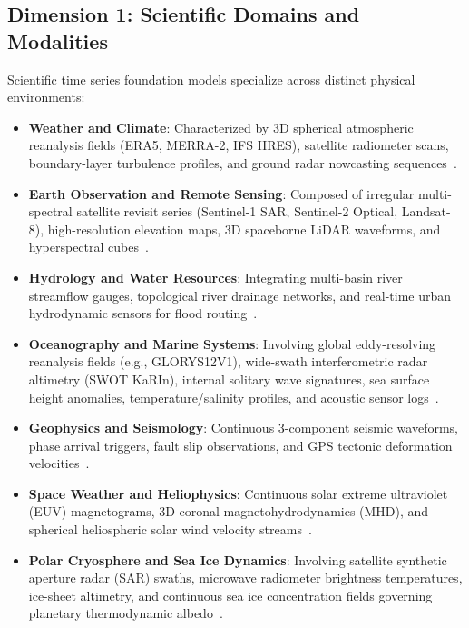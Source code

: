 \subsection{Dimension 1: Scientific Domains and Modalities}
Scientific time series foundation models specialize across distinct physical environments:
\begin{itemize}
    \item \textbf{Weather and Climate}: Characterized by 3D spherical atmospheric reanalysis fields (ERA5, MERRA-2, IFS HRES), satellite radiometer scans, boundary-layer turbulence profiles, and ground radar nowcasting sequences~\cite{bi2023pangu,lam2023graphcast,pathak2022fourcastnet,bodnar2024aurora,nguyen2023stormer,li2024seeds,brandstetter2023clifford,lozano2023buildingblock}.
    \item \textbf{Earth Observation and Remote Sensing}: Composed of irregular multi-spectral satellite revisit series (Sentinel-1 SAR, Sentinel-2 Optical, Landsat-8), high-resolution elevation maps, 3D spaceborne LiDAR waveforms, and hyperspectral cubes~\cite{cong2022satmae,tseng2023presto,tseng2025galileo,jakubik2023prithvi,brown2025alphaearth,smith2023earthpt,xiong2024dofa,hong2024spectralgpt,lang2023canopy}.
    \item \textbf{Hydrology and Water Resources}: Integrating multi-basin river streamflow gauges, topological river drainage networks, and real-time urban hydrodynamic sensors for flood routing~\cite{nearing2024globalflood,kratzert2023caravan,ji2025entropy}.
    \item \textbf{Oceanography and Marine Systems}: Involving global eddy-resolving reanalysis fields (e.g., GLORYS12V1), wide-swath interferometric radar altimetry (SWOT KaRIn), internal solitary wave signatures, sea surface height anomalies, temperature/salinity profiles, and acoustic sensor logs~\cite{wang2024xihe,elaouni2025oceanbench,bi2024oceangpt,cutolo2025swot,wan2024ste}.
    \item \textbf{Geophysics and Seismology}: Continuous 3-component seismic waveforms, phase arrival triggers, fault slip observations, and GPS tectonic deformation velocities~\cite{li2024seist,zhu2019phasenet,woollam2022seisbench}.
    \item \textbf{Space Weather and Heliophysics}: Continuous solar extreme ultraviolet (EUV) magnetograms, 3D coronal magnetohydrodynamics (MHD), and spherical heliospheric solar wind velocity streams~\cite{roy2025surya,du2024glfno,mansouri2025solarwind}.
    \item \textbf{Polar Cryosphere and Sea Ice Dynamics}: Involving satellite synthetic aperture radar (SAR) swaths, microwave radiometer brightness temperatures, ice-sheet altimetry, and continuous sea ice concentration fields governing planetary thermodynamic albedo~\cite{andersson2021icenet,taleghan2025icebench}.

\end{itemize}

